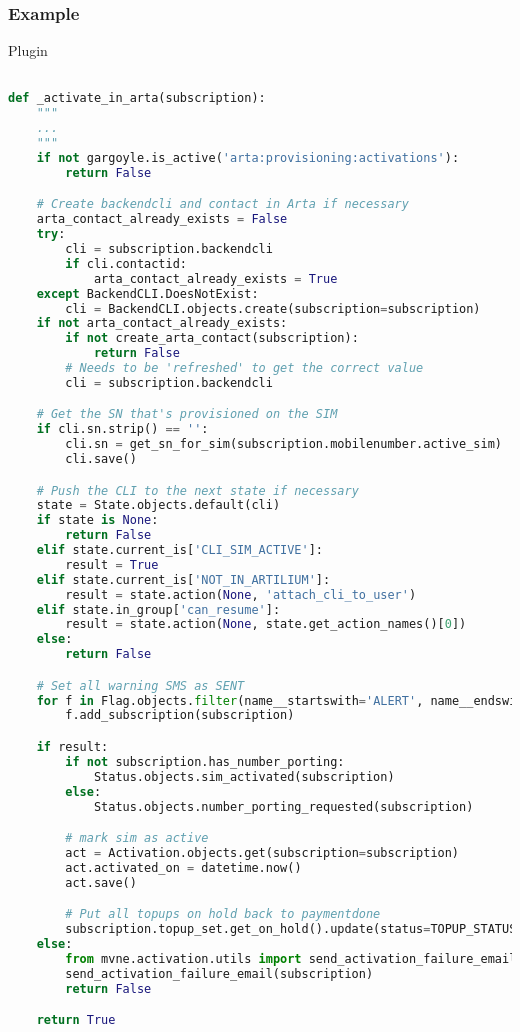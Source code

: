 \begin{frame}[fragile]
\frametitle{Example}
	\begin{block}{Plugin}
        \begin{lstlisting}[language=Python]

def _activate_in_arta(subscription):
    """
    ...
    """
    if not gargoyle.is_active('arta:provisioning:activations'):
        return False

    # Create backendcli and contact in Arta if necessary
    arta_contact_already_exists = False
    try:
        cli = subscription.backendcli
        if cli.contactid:
            arta_contact_already_exists = True
    except BackendCLI.DoesNotExist:
        cli = BackendCLI.objects.create(subscription=subscription)
    if not arta_contact_already_exists:
        if not create_arta_contact(subscription):
            return False
        # Needs to be 'refreshed' to get the correct value
        cli = subscription.backendcli

    # Get the SN that's provisioned on the SIM
    if cli.sn.strip() == '':
        cli.sn = get_sn_for_sim(subscription.mobilenumber.active_sim)
        cli.save()

    # Push the CLI to the next state if necessary
    state = State.objects.default(cli)
    if state is None:
        return False
    elif state.current_is['CLI_SIM_ACTIVE']:
        result = True
    elif state.current_is['NOT_IN_ARTILIUM']:
        result = state.action(None, 'attach_cli_to_user')
    elif state.in_group['can_resume']:
        result = state.action(None, state.get_action_names()[0])
    else:
        return False

    # Set all warning SMS as SENT
    for f in Flag.objects.filter(name__startswith='ALERT', name__endswith='SENT'):
        f.add_subscription(subscription)

    if result:
        if not subscription.has_number_porting:
            Status.objects.sim_activated(subscription)
        else:
            Status.objects.number_porting_requested(subscription)

        # mark sim as active
        act = Activation.objects.get(subscription=subscription)
        act.activated_on = datetime.now()
        act.save()

        # Put all topups on hold back to paymentdone
        subscription.topup_set.get_on_hold().update(status=TOPUP_STATUS_PAYMENT_DONE)
    else:
        from mvne.activation.utils import send_activation_failure_email
        send_activation_failure_email(subscription)
        return False

    return True
        \end{lstlisting}
	\end{block}
\end{frame}

